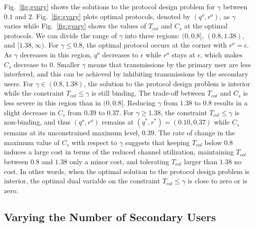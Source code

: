 \documentclass[12pt,draftclsnofoot,onecolumn]{IEEEtran}
\begin{document}
Fig.~\ref{fig:gvary} shows the solutions to the protocol design problem
for $\gamma$ between $0.1$ and $2$. Fig.~\ref{fig:gvary}
plots optimal protocols, denoted by $(q^o,r^o)$, as $\gamma$ varies while
Fig.~\ref{fig:gvary} shows the values of $T_{col}$ and $C_s$
at the optimal protocols. We can divide the range of $\gamma$ into three regions:
$(0, 0.8]$, $(0.8, 1.38)$, and $[1.38, \infty)$.
For $\gamma \leq 0.8$, the optimal protocol occurs at the corner with $r^o = \epsilon$. As $\gamma$ decreases
in this region, $q^o$ decreases to $\epsilon$ while $r^o$ stays at $\epsilon$, which makes $C_s$ decrease to 0.
Smaller $\gamma$ means that transmissions by the primary user are less interfered, and this can be achieved
by inhibiting transmissions by the secondary users. For $\gamma \in (0.8, 1.38)$, the solution to
the protocol design problem is interior while the constraint $T_{col} \leq \gamma$ is still
binding. The trade-off between $T_{col}$ and $C_s$ is less severe in this region
than in $(0, 0.8]$. Reducing $\gamma$ from $1.38$ to $0.8$ results in a slight decrease in $C_s$
from $0.39$ to $0.37$. For $\gamma \geq 1.38$, the constraint
$T_{col} \leq \gamma$ is non-binding, and thus $(q^o,r^o)$ remains at $(q^*,r^*) = (0.10, 0.37)$
while $C_s$ remains at its unconstrained maximum level, $0.39$.
The rate of change in the maximum value of $C_s$ with respect to $\gamma$ suggests that
keeping $T_{col}$ below $0.8$ induces a large cost in terms of the reduced channel utilization,
maintaining $T_{col}$ between $0.8$ and $1.38$ only a minor cost,
and tolerating $T_{col}$ larger than $1.38$ no cost.
In other words, when the optimal solution to the protocol design
problem is interior, the optimal dual variable on the constraint $T_{col} \leq \gamma$ is close
to zero or is zero.

\subsection{Varying the Number of Secondary Users}
\end{document}
